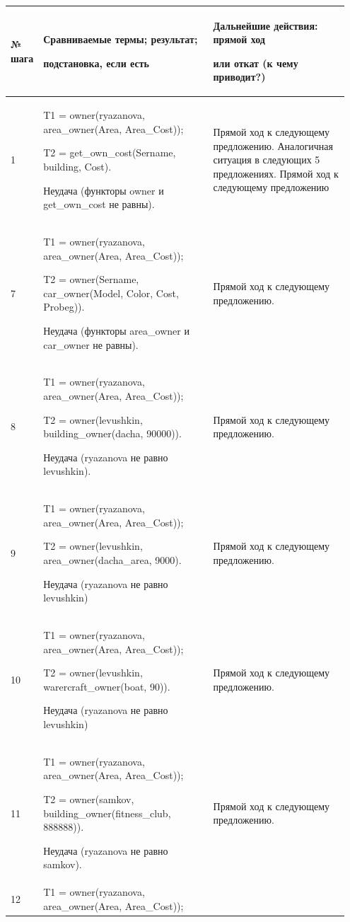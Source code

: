 \documentclass[a4paper,12pt]{article}
\begin{document}
	\begin{center}
		\begin{longtable}[h!]{|p{0.05\linewidth}|p{0.5\linewidth}|p{ 0.4\linewidth}|}
			\hline
			{\bf  № шага} & {\bf Сравниваемые термы; результат; 
				
				подстановка, если есть} & {\bf Дальнейшие действия: прямой ход 
				
				или откат (к чему приводит?)} \\
			\hline
			{1} & {T1 = owner(ryazanova, area\_owner(Area, Area\_Cost));
				
				T2 = get\_own\_cost(Sername, building, Cost).
				
				Неудача (функторы owner и get\_own\_cost не равны).} & {Прямой ход к следующему предложению. Аналогичная ситуация в следующих 5 предложениях. Прямой ход к следующему предложению}\\
			\hline
			{7} & {T1 = owner(ryazanova, area\_owner(Area, Area\_Cost));
				
				T2 = owner(Sername, car\_owner(Model, Color, Cost, Probeg)).
				
				Неудача (функторы area\_owner и car\_owner не равны).} & {Прямой ход к следующему предложению.}\\
			\hline
			{8} & {T1 = owner(ryazanova, area\_owner(Area, Area\_Cost));
				
				T2 = owner(levushkin, building\_owner(dacha, 90000)).
				
				Неудача (ryazanova не равно levushkin).} & {Прямой ход к следующему предложению.}\\
			\hline
			{9} & {T1 = owner(ryazanova, area\_owner(Area, Area\_Cost));
				
				T2 =  owner(levushkin, area\_owner(dacha\_area, 9000).
				
				Неудача (ryazanova не равно levushkin)} & {Прямой ход к следующему предложению.}\\
			\hline
			{10} & {T1 = owner(ryazanova, area\_owner(Area, Area\_Cost));
				
				T2 =  owner(levushkin, warercraft\_owner(boat, 90)).
				
				Неудача (ryazanova не равно levushkin)} & {Прямой ход к следующему предложению.}\\
			\hline
			{11} & {T1 = owner(ryazanova, area\_owner(Area, Area\_Cost));
				
				T2 =  owner(samkov, building\_owner(fitness\_club, 888888)).
				
				Неудача (ryazanova не равно samkov).} & {Прямой ход к следующему предложению.}\\
			\hline
			{12} & {T1 = owner(ryazanova, area\_owner(Area, Area\_Cost));
				
}
\end{longtable}
\end{center}
\end{document}
